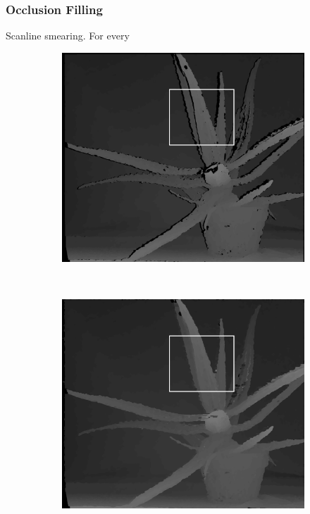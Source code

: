 \subsubsection{Occlusion Filling}

Scanline smearing. For every 

\begin{figure}

  \begin{subfigure}[b]{0.48\textwidth}
    \centering
    \includegraphics[width=\textwidth]{images/no-fill.png}
  \end{subfigure}
  ~
  \begin{subfigure}[b]{0.48\textwidth}
    \centering
    \includegraphics[width=\textwidth]{images/fill.png}
  \end{subfigure}


\end{figure}
